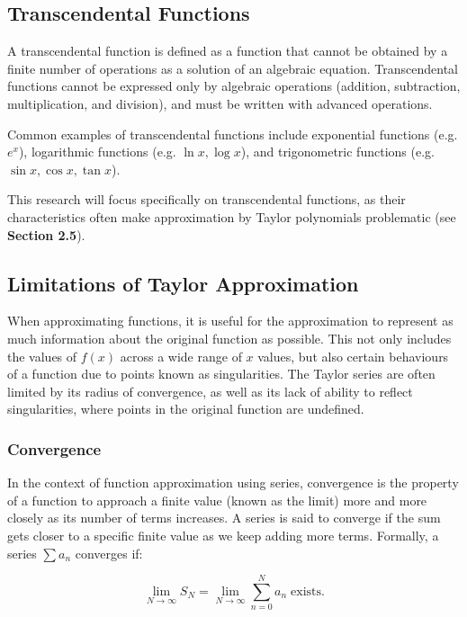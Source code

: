\documentclass[a4paper, 12pt]{article}
\begin{document}
\FloatBarrier

\subsection{Transcendental Functions}
A transcendental function is defined as a function that cannot be obtained by a finite number of operations as a solution of an algebraic equation. Transcendental functions cannot be expressed only by algebraic operations (addition, subtraction, multiplication, and division), and must be written with advanced operations.

Common examples of transcendental functions include exponential functions (e.g. $e^x$), logarithmic functions (e.g. $\ln x, \log x$), and trigonometric functions (e.g. $\sin x, \cos x, \tan x$).

This research will focus specifically on transcendental functions, as their characteristics often make approximation by Taylor polynomials problematic (see \textbf{Section 2.5}).

\subsection{Limitations of Taylor Approximation} 
When approximating functions, it is useful for the approximation to represent as much information about the original function as possible. This not only includes the values of $f(x)$ across a wide range of $x$ values, but also certain behaviours of a function due to points known as singularities. The Taylor series are often limited by its radius of convergence, as well as its lack of ability to reflect singularities, where points in the original function are undefined.

\subsubsection{Convergence}
In the context of function approximation using series, convergence is the property of a function to approach a finite value (known as the limit) more and more  closely as its number of terms increases. A series is said to converge if the sum gets closer to a specific finite value as we keep adding more terms. Formally, a series $\sum a_n$ converges if:

\begin{equation}
\lim_{N \to \infty} S_N = \lim_{N \to \infty} \sum_{n=0}^{N} a_n \;\text{exists}.
\end{equation}
\end{document}
